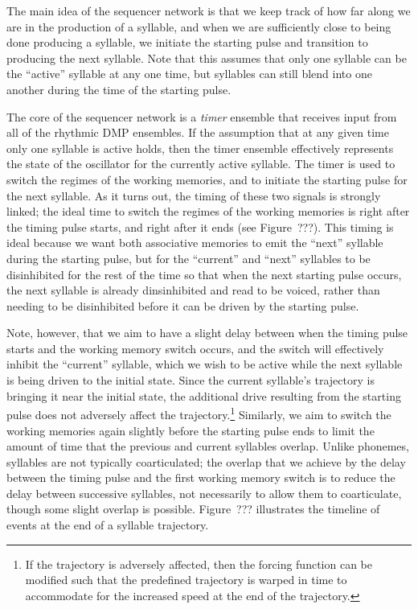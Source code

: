 The main idea of the sequencer network
is that we keep track of
how far along we are in the
production of a syllable,
and when we are sufficiently
close to being done producing a syllable,
we initiate the starting pulse
and transition to producing
the next syllable.
Note that this assumes that
only one syllable can be the
``active'' syllable at any one time,
but syllables can still
blend into one another
during the time of
the starting pulse.

The core of the sequencer network
is a \textit{timer} ensemble
that receives input from
all of the rhythmic DMP ensembles.
If the assumption that
at any given time
only one syllable is active holds,
then the timer ensemble effectively
represents the state of the oscillator
for the currently active syllable.
The timer is used to
switch the regimes of the working memories,
and to initiate the starting pulse
for the next syllable.
As it turns out, the timing
of these two signals is strongly linked;
the ideal time to switch the regimes
of the working memories
is right after the timing pulse starts,
and right after it ends
(see Figure~???).
This timing is ideal because
we want both associative memories
to emit the ``next'' syllable
during the starting pulse,
but for the ``current'' and ``next'' syllables
to be disinhibited for the rest
of the time so that when the next
starting pulse occurs,
the next syllable is already dinsinhibited
and read to be voiced,
rather than needing to be disinhibited
before it can be driven by the starting pulse.

Note, however, that we aim to
have a slight delay between
when the timing pulse starts
and the working memory switch occurs,
and the switch will effectively
inhibit the ``current'' syllable,
which we wish to be active
while the next syllable is being
driven to the initial state.
Since the current syllable's trajectory
is bringing it near the initial state,
the additional drive resulting
from the starting pulse
does not adversely affect the
trajectory.\footnote{
  If the trajectory is adversely affected,
  then the forcing function can be modified
  such that the predefined trajectory is
  warped in time to accommodate for the
  increased speed at the end of the trajectory.}
Similarly, we aim to switch
the working memories again
slightly before the starting pulse ends
to limit the amount of time
that the previous and current syllables overlap.
Unlike phonemes, syllables are not
typically coarticulated;
the overlap that we achieve by the
delay between the timing pulse
and the first working memory switch
is to reduce the delay between
successive syllables,
not necessarily to allow them
to coarticulate,
though some slight overlap is possible.
Figure~??? illustrates the timeline
of events at the end of a syllable trajectory.


